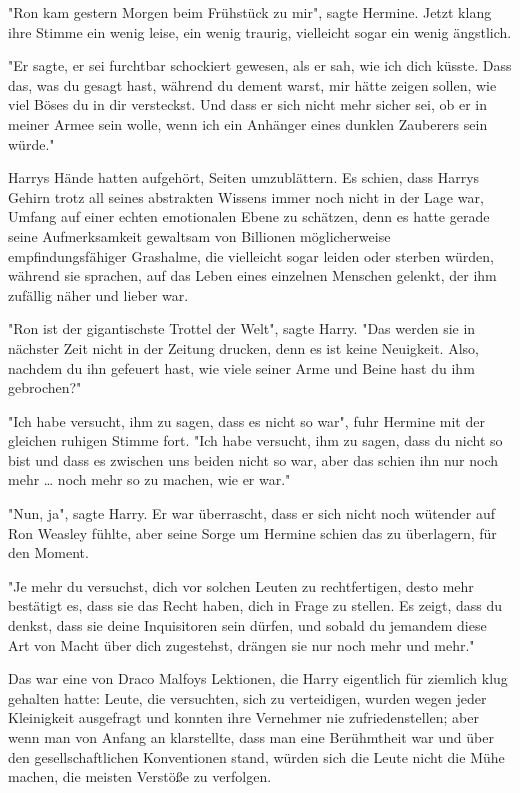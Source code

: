 {"Ron kam gestern Morgen beim Frühstück zu mir", sagte Hermine. Jetzt klang ihre Stimme ein wenig leise, ein wenig traurig, vielleicht sogar ein wenig ängstlich.

"Er sagte, er sei furchtbar schockiert gewesen, als er sah, wie ich dich küsste. Dass das, was du gesagt hast, während du dement warst, mir hätte zeigen sollen, wie viel Böses du in dir versteckst. Und dass er sich nicht mehr sicher sei, ob er in meiner Armee sein wolle, wenn ich ein Anhänger eines dunklen Zauberers sein würde."

Harrys Hände hatten aufgehört, Seiten umzublättern. Es schien, dass Harrys Gehirn trotz all seines abstrakten Wissens immer noch nicht in der Lage war, Umfang auf einer echten emotionalen Ebene zu schätzen, denn es hatte gerade seine Aufmerksamkeit gewaltsam von Billionen möglicherweise empfindungsfähiger Grashalme, die vielleicht sogar leiden oder sterben würden, während sie sprachen, auf das Leben eines einzelnen Menschen gelenkt, der ihm zufällig näher und lieber war.

"Ron ist der gigantischste Trottel der Welt", sagte Harry. "Das werden sie in nächster Zeit nicht in der Zeitung drucken, denn es ist keine Neuigkeit. Also, nachdem du ihn gefeuert hast, wie viele seiner Arme und Beine hast du ihm gebrochen?"

"Ich habe versucht, ihm zu sagen, dass es nicht so war", fuhr Hermine mit der gleichen ruhigen Stimme fort. "Ich habe versucht, ihm zu sagen, dass du nicht so bist und dass es zwischen uns beiden nicht so war, aber das schien ihn nur noch mehr … noch mehr so zu machen, wie er war."

"Nun, ja", sagte Harry. Er war überrascht, dass er sich nicht noch wütender auf Ron Weasley fühlte, aber seine Sorge um Hermine schien das zu überlagern, für den Moment.

"Je mehr du versuchst, dich vor solchen Leuten zu rechtfertigen, desto mehr bestätigt es, dass sie das Recht haben, dich in Frage zu stellen. Es zeigt, dass du denkst, dass sie deine Inquisitoren sein dürfen, und sobald du jemandem diese Art von Macht über dich zugestehst, drängen sie nur noch mehr und mehr."

Das war eine von Draco Malfoys Lektionen, die Harry eigentlich für ziemlich klug gehalten hatte: Leute, die versuchten, sich zu verteidigen, wurden wegen jeder Kleinigkeit ausgefragt und konnten ihre Vernehmer nie zufriedenstellen; aber wenn man von Anfang an klarstellte, dass man eine Berühmtheit war und über den gesellschaftlichen Konventionen stand, würden sich die Leute nicht die Mühe machen, die meisten Verstöße zu verfolgen.

}
